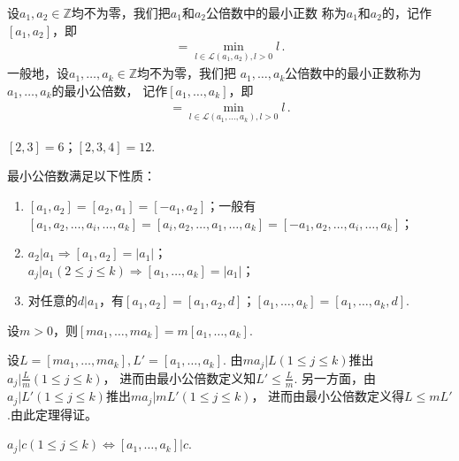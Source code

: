 \begin{definition}
    设$a_1,a_2\in\mathbb{Z}$均不为零，我们把$a_1$和$a_2$公倍数中的最小正数
    称为$a_1$和$a_2$的，记作$[a_1,a_2]$，即
    \begin{align}
        [a_1,a_2]=\min\limits_{l\in\mathcal{L}(a_1,a_2),l>0}{l}\, .
    \end{align}
    一般地，设$a_1,\ldots,a_k\in\mathbb{Z}$均不为零，我们把
    $a_1,\ldots,a_k$公倍数中的最小正数称为$a_1,\ldots,a_k$的最小公倍数，
    记作$[a_1,\ldots,a_k]$，即
    \begin{align}
        [a_1,\ldots,a_k]=\min\limits_{l\in\mathcal{L}(a_1,\ldots,a_k),l>0}{l}\, .
    \end{align}
\end{definition}
\begin{example}
    $[2,3]=6$；$[2,3,4]=12$.
\end{example}
\begin{theorem}\label{theorem:7.ex02.9}
    最小公倍数满足以下性质：
    \begin{enumerate}
        \item $[a_1,a_2]=[a_2,a_1]=[-a_1,a_2]$；一般有\\
              $[a_1,a_2,\ldots,a_i,\ldots,a_k]=[a_i,a_2,\ldots,a_1,\ldots,a_k]=[-a_1,a_2,\ldots,a_i,\ldots,a_k]$；
        \item $a_2|a_1\Rightarrow [a_1,a_2]=|a_1|$；\\
              $a_j|a_1(2\le j\le k)\Rightarrow [a_1,\ldots,a_k]=|a_1|$；
        \item 对任意的$d|a_1$，有$[a_1,a_2]=[a_1,a_2,d]$；$[a_1,\ldots,a_k]=[a_1,\ldots,a_k,d]$.
    \end{enumerate}
\end{theorem}
\begin{theorem}\label{theorem:7.ex02.10}
    设$m>0$，则$[ma_1,\ldots,ma_k]=m[a_1,\ldots,a_k]$.
\end{theorem}
\begin{prove}
    设$L=[ma_1,\ldots,ma_k], L'=[a_1,\ldots,a_k]$.
    由$ma_j|L(1\le j\le k)$推出$\displaystyle a_j\bigg|\frac{L}{m}(1\le j\le k)$，
    进而由最小公倍数定义知$L'\le\displaystyle\frac{L}{m}$.
    另一方面，由$a_j|L'(1\le j\le k)$推出$ma_j|mL'(1\le j\le k)$，
    进而由最小公倍数定义得$L\le mL'$.由此定理得证。
\end{prove}
\begin{theorem}\label{theorem:7.ex02.11}
    $a_j|c(1\le j\le k)\Leftrightarrow [a_1,\ldots,a_k]|c$.
\end{theorem}
